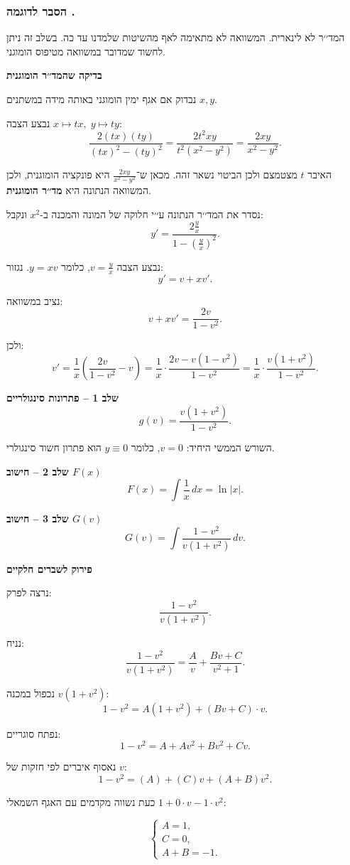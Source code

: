 \documentclass{article}
\numberwithin{equation}{section}
\newcounter{example}[section]
\renewcommand{\theexample}{\thesection.\arabic{example}}
\newcommand{\explanation}{%
  \subsubsection*{הסבר לדוגמה \theexample}%
}
\begin{document}
\explanation

המד׳׳ר לא לינארית. המשוואה לא מתאימה לאף מהשיטות שלמדנו עד כה. בשלב זה ניתן לחשוד שמדובר במשוואה מטיפוס הומוגני.

\textbf{ בדיקה שהמד׳׳ר הומוגנית}

נבדוק אם אגף ימין הומוגני באותה מידה במשתנים $x,y$.

נבצע הצבה $x\mapsto tx, \; y\mapsto ty$:  
\[
\frac{2(tx)(ty)}{(tx)^2-(ty)^2}
= \frac{2t^2xy}{t^2(x^2-y^2)}
= \frac{2xy}{x^2-y^2}.
\]

האיבר $t$ מצטמצם ולכן הביטוי נשאר זהה.  
מכאן ש־$\tfrac{2xy}{x^2-y^2}$ היא פונקציה הומוגנית, ולכן המשוואה הנתונה היא \textbf{מד׳׳ר הומוגנית}.


נסדר את המד׳׳ר הנתונה ע׳׳י חלוקה של המונה והמכנה ב-$x^{2}$ ונקבל:
\[
y' = \frac{2\frac{y}{x}}{1-\left(\frac{y}{x}\right)^{2}}.
\]

נבצע הצבה $v=\tfrac{y}{x}$, כלומר $y=xv$.  
נגזור: 
\[
y'=v+ xv'.
\]

נציב במשוואה:
\[
v+xv'=\frac{2v}{1-v^2}.
\]

ולכן:
\[
v'=\frac{1}{x}\left(\frac{2v}{1-v^2}-v\right)
= \frac{1}{x}\cdot\frac{2v-v(1-v^2)}{1-v^2}
= \frac{1}{x}\cdot\frac{v(1+v^2)}{1-v^2}.
\]

\textbf{שלב 1 – פתרונות סינגולריים}  
\[
g(v)=\frac{v(1+v^2)}{1-v^2}.
\]

השורש הממשי היחיד: $v=0$, כלומר $y\equiv 0$ הוא פתרון חשוד סינגולרי.

\textbf{שלב 2 – חישוב $F(x)$}
\[
F(x)=\int \frac{1}{x}\,dx = \ln|x|.
\]

\textbf{שלב 3 – חישוב $G(v)$}
\[
G(v)=\int \frac{1-v^2}{v(1+v^2)}\,dv.
\]

\textbf{פירוק לשברים חלקיים}

נרצה לפרק:
\[
\frac{1-v^2}{v(1+v^2)}.
\]

נניח:
\[
\frac{1-v^2}{v(1+v^2)} = \frac{A}{v} + \frac{Bv+C}{v^2+1}.
\]

נכפול במכנה $v(1+v^2)$:
\[
1-v^2 = A(1+v^2) + (Bv+C)\cdot v.
\]

נפתח סוגריים:
\[
1-v^2 = A + Av^2 + Bv^2 + Cv.
\]

נאסוף איברים לפי חזקות של $v$:
\[
1-v^2 = (A) + (C)v + (A+B)v^2.
\]

כעת נשווה מקדמים עם האגף השמאלי $1 + 0\cdot v -1\cdot v^2$:

\[
\begin{cases}
A = 1, \\
C = 0, \\
A+B = -1.
\end{cases}
\]
\end{document}
